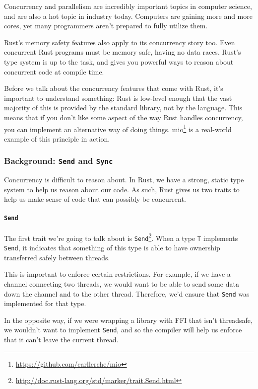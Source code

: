 \documentclass[a4paper,]{book}
\renewcommand{\href}[2]{#2\footnote{\url{#1}}}
\let\oldparagraph\paragraph
\renewcommand{\paragraph}[1]{\oldparagraph{#1}\mbox{}}
\begin{document}
Concurrency and parallelism are incredibly important topics in computer
science, and are also a hot topic in industry today. Computers are
gaining more and more cores, yet many programmers aren't prepared to
fully utilize them.

Rust's memory safety features also apply to its concurrency story too.
Even concurrent Rust programs must be memory safe, having no data races.
Rust's type system is up to the task, and gives you powerful ways to
reason about concurrent code at compile time.

Before we talk about the concurrency features that come with Rust, it's
important to understand something: Rust is low-level enough that the
vast majority of this is provided by the standard library, not by the
language. This means that if you don't like some aspect of the way Rust
handles concurrency, you can implement an alternative way of doing
things. \href{https://github.com/carllerche/mio}{mio} is a real-world
example of this principle in action.

\subsubsection{\texorpdfstring{Background: \texttt{Send} and
\texttt{Sync}}{Background: Send and Sync}}\label{background-send-and-sync}

Concurrency is difficult to reason about. In Rust, we have a strong,
static type system to help us reason about our code. As such, Rust gives
us two traits to help us make sense of code that can possibly be
concurrent.

\paragraph{\texorpdfstring{\texttt{Send}}{Send}}\label{send}

The first trait we're going to talk about is
\href{http://doc.rust-lang.org/std/marker/trait.Send.html}{\texttt{Send}}.
When a type \texttt{T} implements \texttt{Send}, it indicates that
something of this type is able to have ownership transferred safely
between threads.

This is important to enforce certain restrictions. For example, if we
have a channel connecting two threads, we would want to be able to send
some data down the channel and to the other thread. Therefore, we'd
ensure that \texttt{Send} was implemented for that type.

In the opposite way, if we were wrapping a library with FFI that isn't
threadsafe, we wouldn't want to implement \texttt{Send}, and so the
compiler will help us enforce that it can't leave the current thread.
\end{document}
